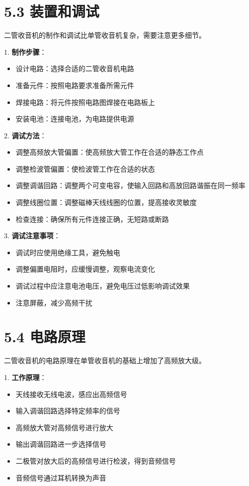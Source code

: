 \documentclass[12pt,UTF8]{ctexbook}
\begin{document}
\section*{5.3 装置和调试}

二管收音机的制作和调试比单管收音机复杂，需要注意更多细节。

1. \textbf{制作步骤}：
   \begin{itemize}[leftmargin=3.5em]
   \item 设计电路：选择合适的二管收音机电路
   \item 准备元件：按照电路要求准备所需元件
   \item 焊接电路：将元件按照电路图焊接在电路板上
   \item 安装电池：连接电池，为电路提供电源
   \end{itemize}

2. \textbf{调试方法}：
   \begin{itemize}[leftmargin=3.5em]
   \item 调整高频放大管偏置：使高频放大管工作在合适的静态工作点
   \item 调整检波管偏置：使检波管工作在合适的状态
   \item 调整调谐回路：调整两个可变电容，使输入回路和高放回路谐振在同一频率
   \item 调整线圈位置：调整磁棒天线线圈的位置，提高接收灵敏度
   \item 检查连接：确保所有元件连接正确，无短路或断路
   \end{itemize}

3. \textbf{调试注意事项}：
   \begin{itemize}[leftmargin=3.5em]
   \item 调试时应使用绝缘工具，避免触电
   \item 调整偏置电阻时，应缓慢调整，观察电流变化
   \item 调试过程中应注意电池电压，避免电压过低影响调试效果
   \item 注意屏蔽，减少高频干扰
   \end{itemize}

\section*{5.4 电路原理}

二管收音机的电路原理在单管收音机的基础上增加了高频放大级。

1. \textbf{工作原理}：
   \begin{itemize}[leftmargin=3.5em]
   \item 天线接收无线电波，感应出高频信号
   \item 输入调谐回路选择特定频率的信号
   \item 高频放大管对高频信号进行放大
   \item 输出调谐回路进一步选择信号
   \item 二极管对放大后的高频信号进行检波，得到音频信号
   \item 音频信号通过耳机转换为声音
   \end{itemize}
\end{document}
